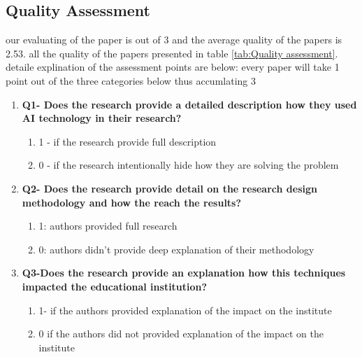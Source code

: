 \subsection{Quality Assessment}
\label{Quality_Assessment}
our evaluating of the paper is out of 3 and the average quality of the papers is 2.53. all the quality of the papers presented in table \ref{tab:Quality assessment}. detaile explination of the assessment points are below: every paper will take 1 point out of the three categories below thus accumlating 3 


\begin{enumerate}
    \item
    \textbf{Q1- Does the research provide a detailed description how they used AI technology in their research?}
\begin{enumerate}
\item 1 - if the research provide full description               
\item 0 - if the research intentionally hide how they are solving the problem           
\end{enumerate}


\item 
\textbf{Q2- Does the research provide detail on the research design methodology and how the reach the results?}\begin{enumerate}
\item  1: authors provided full research
\item  0: authors didn't provide deep explanation of their methodology 
\end{enumerate}

\item 
\textbf{Q3-Does the research provide an explanation how this techniques impacted the educational institution?}
\begin{enumerate}
\item  1- if the authors provided explanation of the impact on the institute                  
\item  0 if the authors did not provided explanation of the impact on the institute          
\end{enumerate}
\end{enumerate}
